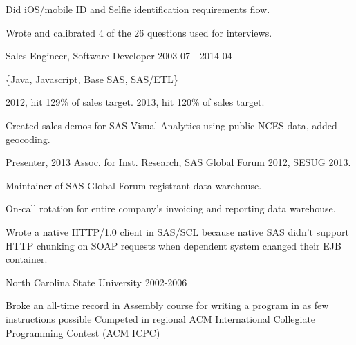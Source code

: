 \documentclass[11pt,english]{article}
\begin{document}
\begin{description}
Did iOS/mobile ID and Selfie identification requirements flow.

Wrote and calibrated 4 of the 26 questions used for interviews.

           {Sales Engineer, Software Developer}
           {2003-07 - 2014-04}

\{Java, Javascript, Base SAS, SAS/ETL\}

2012, hit 129\% of sales target. 2013, hit 120\% of sales target.

Created sales demos for SAS Visual Analytics using public NCES data, added geocoding.

Presenter, 2013 Assoc. for Inst. Research, \href{http://support.sas.com/resources/papers/proceedings12/075-2012.pdf}{SAS Global Forum 2012}, \href{http://www.sesug.org/SESUG2013/abstract.html#CC-02}{SESUG 2013}.

Maintainer of SAS Global Forum registrant data warehouse.

On-call rotation for entire company's invoicing and reporting data warehouse.

Wrote a native HTTP/1.0 client in SAS/SCL because native SAS didn't support HTTP chunking on SOAP requests when dependent system changed their EJB container.

\end{description}


\begin{description}
\squish
{} {North Carolina State University}
           {2002-2006}
 
Broke an all-time record in Assembly course for writing a program in as few instructions possible
Competed in regional ACM International Collegiate Programming Contest (ACM ICPC)

\end{description}

\end{document}
